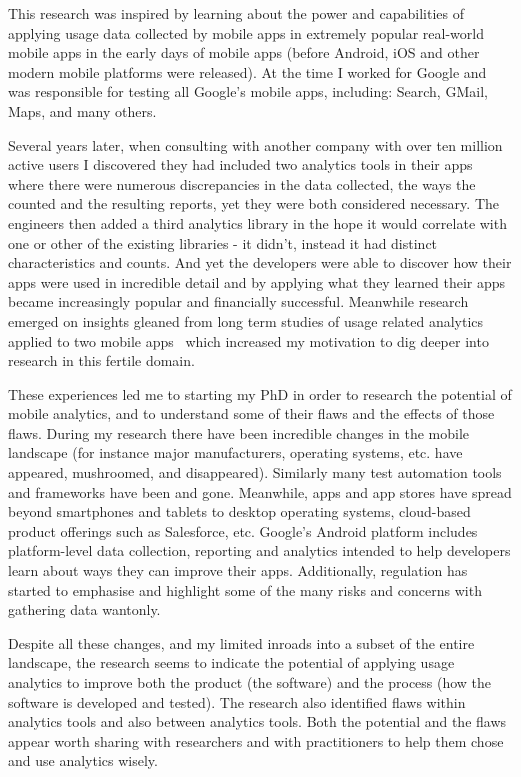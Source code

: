 \hrulefill

This research was inspired by learning about the power and capabilities of applying usage data collected by mobile apps in extremely popular real-world mobile apps in the early days of mobile apps (before Android, iOS and other modern mobile platforms were released). At the time I worked for Google and was responsible for testing all Google's mobile apps, including: Search, GMail, Maps, and many others.

Several years later, when consulting with another company with over ten million active users I discovered they had included two analytics tools in their apps where there were numerous discrepancies in the data collected, the ways the counted and the resulting reports, yet they were both considered necessary. The engineers then added a third analytics library in the hope it would correlate with one or other of the existing libraries - it didn't, instead it had distinct characteristics and counts. And yet the developers were able to discover how their apps were used in incredible detail and by applying what they learned their apps became increasingly popular and financially successful. Meanwhile research emerged on insights gleaned from long term studies of usage related analytics applied to two mobile apps~\citep{patro2013_capturing_mobile_experience_in_the_wild} which increased my motivation to dig deeper into research in this fertile domain.

These experiences led me to starting my PhD in order to research the potential of mobile analytics, and to understand some of their flaws and the effects of those flaws. During my research there have been incredible changes in the mobile landscape (for instance major manufacturers, operating systems, etc. have appeared, mushroomed, and disappeared). Similarly many test automation tools and frameworks have been and gone. Meanwhile, apps and app stores have spread beyond smartphones and tablets to desktop operating systems, cloud-based product offerings such as Salesforce, etc. Google's Android platform includes platform-level data collection, reporting and analytics intended to help developers learn about ways they can improve their apps. Additionally, regulation has started to emphasise and highlight some of the many risks and concerns with gathering data wantonly. 

Despite all these changes, and my limited inroads into a subset of the entire landscape, the research seems to indicate the potential of applying usage analytics to improve both the product (the software) and the process (how the software is developed and tested). The research also identified flaws within analytics tools and also between analytics tools. Both the potential and the flaws appear worth sharing with researchers and with practitioners to help them chose and use analytics wisely.



